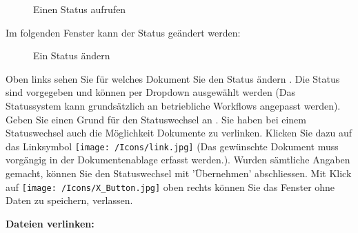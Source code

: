 \begin{figure}[H]
\caption{Einen Status aufrufen}
\end{figure}

Im folgenden Fenster kann der Status geändert werden:

\begin{figure}[H]
\caption{Ein Status ändern}
\end{figure}

Oben links sehen Sie für welches Dokument Sie den Status ändern . Die Status sind vorgegeben und können per Dropdown ausgewählt werden  (Das Statussystem kann grundsätzlich an betriebliche Workflows angepasst werden). Geben Sie einen Grund für den Statuswechsel an . Sie haben bei einem Statuswechsel auch die Möglichkeit Dokumente zu verlinken. Klicken Sie dazu auf das Linksymbol \texttt{[image: /Icons/link.jpg]}  (Das gewünschte Dokument muss vorgängig in der Dokumentenablage erfasst werden.). Wurden sämtliche Angaben gemacht, können Sie den Statuswechsel mit 'Übernehmen'  abschliessen. Mit Klick auf \texttt{[image: /Icons/X\_Button.jpg]}  oben rechts können Sie das Fenster ohne Daten zu speichern, verlassen.

\vspace{\baselineskip}

\textbf{Dateien verlinken:}

